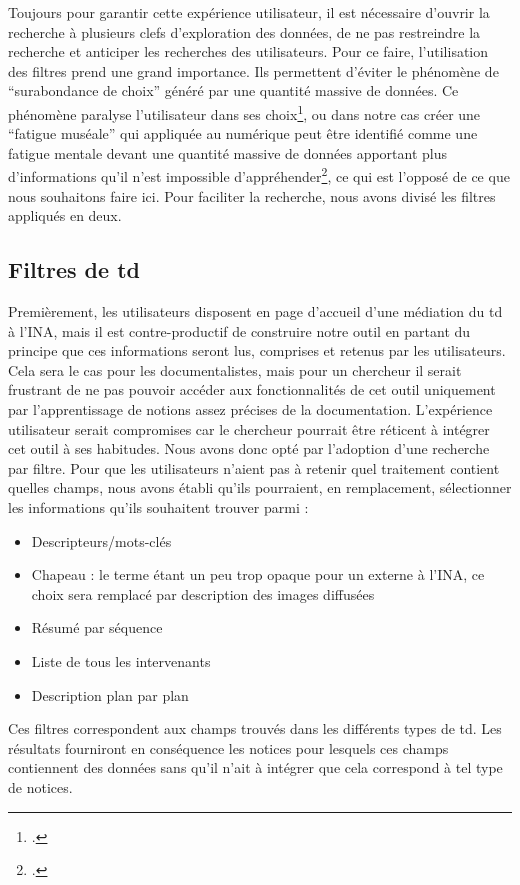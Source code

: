 Toujours pour garantir cette expérience utilisateur, il est nécessaire d'ouvrir la recherche à plusieurs clefs d'exploration des données, de ne pas restreindre la recherche et anticiper les recherches des utilisateurs. Pour ce faire, l'utilisation des filtres prend une grand importance. Ils permettent d'éviter le phénomène de \enquote{surabondance de choix} généré par une quantité massive de données. Ce phénomène paralyse l'utilisateur dans ses choix\footcite[242]{farchy2023}, ou dans notre cas créer une \enquote{fatigue muséale} qui appliquée au numérique peut être identifié comme une fatigue mentale devant une quantité massive de données apportant plus d'informations qu'il n'est impossible d'appréhender\footcite[Notion développée dans :][5]{griveau2024}, ce qui est l'opposé de ce que nous souhaitons faire ici. Pour faciliter la recherche, nous avons divisé les filtres appliqués en deux.  

\subsection{Filtres de \gls{td}}

Premièrement, les utilisateurs disposent en page d'accueil d'une médiation du \gls{td} à l'INA, mais il est contre-productif de construire notre outil en partant du principe que ces informations seront lus, comprises et retenus par les utilisateurs. Cela sera le cas pour les documentalistes, mais pour un chercheur il serait frustrant de ne pas pouvoir accéder aux fonctionnalités de cet outil uniquement par l'apprentissage de notions assez précises de la documentation. L'expérience utilisateur serait compromises car le chercheur pourrait être réticent à intégrer cet outil à ses habitudes. Nous avons donc opté par l'adoption d'une recherche par filtre. Pour que les utilisateurs n'aient pas à retenir quel traitement contient quelles champs, nous avons établi qu'ils pourraient, en remplacement, sélectionner les informations qu'ils souhaitent trouver parmi : 
\begin{itemize}
	\item Descripteurs/mots-clés
	\item Chapeau : le terme étant un peu trop opaque pour un externe à l'INA, ce choix sera remplacé par description des images diffusées
	\item Résumé par séquence
	\item Liste de tous les intervenants
	\item Description plan par plan
\end{itemize}
Ces filtres correspondent aux champs trouvés dans les différents types de \gls{td}. Les résultats fourniront en conséquence les notices pour lesquels ces champs contiennent des données sans qu'il n'ait à intégrer que cela correspond à tel type de notices. 


